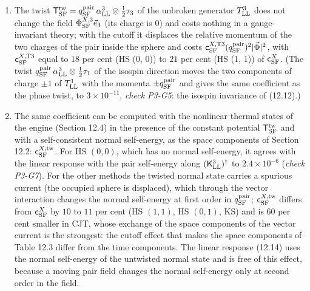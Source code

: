 \documentclass[
  10pt,
]{article}
\providecommand{\tightlist}{%
  \setlength{\itemsep}{0pt}\setlength{\parskip}{0pt}}
\begin{document}
\begin{enumerate}
\def\labelenumi{\arabic{enumi}.}
\tightlist
\item
  The twist
  \(\mathsf T^{\rm tw}_{\rm SF}=q^{\rm pair}_{\rm SF}\,\alpha^3_{\rm LL}\otimes\tfrac12\tau_3\)
  of the unbroken generator \(T^3_{\rm LL}\) does not change the field
  \(\Phi^{X,3}_{\rm SF}\vec e_3\) (its charge is 0) and costs nothing in
  a gauge-invariant theory; with the cutoff it displaces the relative
  momentum of the two charges of the pair inside the sphere and costs
  \(\mathsf c^{X,{\rm T3}}_{\rm SF}(q^{\rm pair}_{\rm SF})^2\lvert\vec\Phi\rvert^2\),
  with \(\mathsf c^{X,{\rm T3}}_{\rm SF}\) equal to \(18\) per cent (HS
  (0, 0)) to \(21\) per cent (HS (1, 1)) of \(\mathsf c^X_{\rm SF}\).
  (The twist
  \(q^{\rm pair}_{\rm SF}\,\alpha^3_{\rm LL}\otimes\tfrac12\tau_1\) of
  the isospin direction moves the two components of charge \(\pm1\) of
  \(T^1_{\rm LL}\) with the momenta \(\pm q^{\rm pair}_{\rm SF}\) and
  gives the same coefficient as the phase twist, to \(3\times10^{-11}\),
  \emph{check P3-G5}: the isospin invariance of (12.12).)
\item
  The same coefficient can be computed with the nonlinear thermal states
  of the engine (Section 12.4) in the presence of the constant potential
  \(\mathsf T^{\rm tw}_{\rm SF}\) and with a self-consistent normal
  self-energy, as the space components of Section 12.2:
  \(\mathsf c^{X,{\rm tw}}_{\rm SF}\). For HS \((0,0)\), which has no
  normal self-energy, it agrees with the linear response with the pair
  self-energy along \((\mathsf K^3_{\rm LL})^\dagger\) to
  \(2.4\times10^{-6}\) (\emph{check P3-G7}). For the other methods the
  twisted normal state carries a spurious current (the occupied sphere
  is displaced), which through the vector interaction changes the normal
  self-energy at first order in \(q^{\rm pair}_{\rm SF}\);
  \(\mathsf c^{X,{\rm tw}}_{\rm SF}\) differs from
  \(\mathsf c^X_{\rm SF}\) by \(10\) to \(11\) per cent (HS \((1,1)\),
  HS \((0,1)\), KS) and is \(60\) per cent smaller in CJT, whose
  exchange of the space components of the vector current is the
  strongest: the cutoff effect that makes the space components of Table
  12.3 differ from the time components. The linear response (12.14) uses
  the normal self-energy of the untwisted normal state and is free of
  this effect, because a moving pair field changes the normal
  self-energy only at second order in the field.
\end{enumerate}
\end{document}
